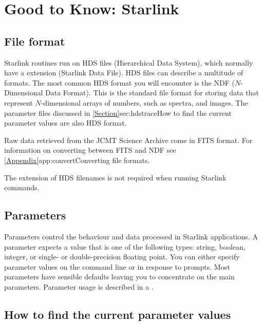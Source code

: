 \documentclass[11pt,oneside,chapters]{starlink}
\begin{document}
\newpage
\chapter{Good to Know: Starlink}
\label{sec:starlink}

\section{File format}
\label{sec:format}

Starlink routines run on HDS files (Hierarchical Data System), which
normally have a  extension (Starlink Data File).
HDS files can describe a multitude of formats. The most common HDS
format you will encounter is the NDF ($N$-Dimensional Data
Format)\cite{ssds}. This is the standard file format for storing data
that represent $N$-dimensional arrays of numbers, such as spectra, and
images.  The parameter files discussed in
\cref{Section}{sec:hdstrace}{How to find the current parameter values}
are also HDS format.

Raw data retrieved from the JCMT Science Archive come in FITS format.
For information on converting between FITS and NDF see
\cref{Appendix}{app:convert}{Converting file formats}.

\begin{tip}
The  extension of HDS filenames is not required when running
Starlink commands.
\end{tip}

\section{Parameters}
\label{sec:parameters}

Parameters control the behaviour and data processed in Starlink
applications.  A parameter expects a value that is one of the
following types: string, boolean, integer, or single- or
double-precision floating point.  You can either specify parameter
values on the command line or in response to prompts.  Most parameters
have sensible defaults leaving you to concentrate on the main
parameters.  Parameter usage is described in a
.

\section{How to find the current parameter values}
\label{sec:hdstrace}
\end{document}
